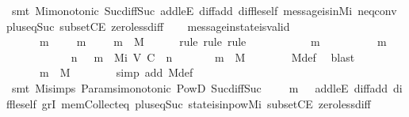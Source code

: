 \begin{isabellebody}
%
\isatagproof
{}\isamarkupfalse%
\ {\isacharparenleft}smt\ Mi{\isacharunderscore}monotonic\ Suc{\isacharunderscore}diff{\isacharunderscore}Suc\ add{\isacharunderscore}leE\ diff{\isacharunderscore}add\ diff{\isacharunderscore}le{\isacharunderscore}self\ message{\isacharunderscore}is{\isacharunderscore}in{\isacharunderscore}Mi\ neq{}{\isacharunderscore}conv\ plus{\isacharunderscore}{}{\isacharunderscore}eq{\isacharunderscore}Suc\ subsetCE\ zero{\isacharunderscore}less{\isacharunderscore}diff{\isacharparenright}%
\endisatagproof
{\isafoldproof}%
%
\isadelimproof
\isanewline
%
\endisadelimproof
\isanewline
\ \ \isamarkupfalse%
\ message{\isacharunderscore}in{\isacharunderscore}state{\isacharunderscore}is{\isacharunderscore}valid\ {\isacharcolon}\isanewline
\ \ \ \ {\isachardoublequoteopen}{\isasymforall}\ {\isasymsigma}\ m{\isachardot}\ {\isasymsigma}\ {\isasymin}\ {\isasymSigma}\ {\isasymand}\ m\ {\isasymin}\ {\isasymsigma}\ {\isasymlongrightarrow}\ \ m\ {\isasymin}\ M{\isachardoublequoteclose}\isanewline
%
\isadelimproof
\ \ \ \ %
\endisadelimproof
%
\isatagproof
{}\isamarkupfalse%
\ {\isacharparenleft}rule{\isacharcomma}\ rule{\isacharcomma}\ rule{\isacharparenright}\isanewline
\ \ \isamarkupfalse%
\ {\isacharminus}\isanewline
\ \ \ \ \isamarkupfalse%
\ {\isasymsigma}\ m\isanewline
\ \ \ \ \isamarkupfalse%
\ {\isachardoublequoteopen}{\isasymsigma}\ {\isasymin}\ {\isasymSigma}\ {\isasymand}\ m\ {\isasymin}\ {\isasymsigma}{\isachardoublequoteclose}\isanewline
\ \ \ \ \isamarkupfalse%
\isanewline
\ \ \ \ \ \ {\isachardoublequoteopen}{\isasymexists}\ n\ {\isasymin}\ {\isasymnat}{\isachardot}\ m\ {\isasymin}\ Mi\ {\isacharparenleft}V{\isacharcomma}\ C{\isacharcomma}\ {\isasymepsilon}{\isacharparenright}\ n\isanewline
\ \ \ \ \ \ {\isasymLongrightarrow}\ m\ {\isasymin}\ M{\isachardoublequoteclose}\isanewline
\ \ \ \ \ \ \isamarkupfalse%
\ M{\isacharunderscore}def\ \isamarkupfalse%
\ blast\ \isanewline
\ \ \ \ \isamarkupfalse%
\ \isamarkupfalse%
\isanewline
\ \ \ \ \ \ {\isachardoublequoteopen}m\ {\isasymin}\ M{\isachardoublequoteclose}\isanewline
\ \ \ \ \ \ \isamarkupfalse%
\ {\isacharparenleft}simp\ add{\isacharcolon}\ M{\isacharunderscore}def{\isacharparenright}\isanewline
\ \ \ \ \ \ \isamarkupfalse%
\ {\isacharparenleft}smt\ Mi{\isachardot}simps\ Params{\isachardot}{\isasymSigma}i{\isacharunderscore}monotonic\ PowD\ Suc{\isacharunderscore}diff{\isacharunderscore}Suc\ {\isacartoucheopen}{\isasymsigma}\ {\isasymin}\ {\isasymSigma}\ {\isasymand}\ m\ {\isasymin}\ {\isasymsigma}{\isacartoucheclose}\ add{\isacharunderscore}leE\ diff{\isacharunderscore}add\ diff{\isacharunderscore}le{\isacharunderscore}self\ gr{}I\ mem{\isacharunderscore}Collect{\isacharunderscore}eq\ plus{\isacharunderscore}{}{\isacharunderscore}eq{\isacharunderscore}Suc\ state{\isacharunderscore}is{\isacharunderscore}in{\isacharunderscore}pow{\isacharunderscore}Mi\ subsetCE\ zero{\isacharunderscore}less{\isacharunderscore}diff{\isacharparenright}\isanewline

\end{isabellebody}
